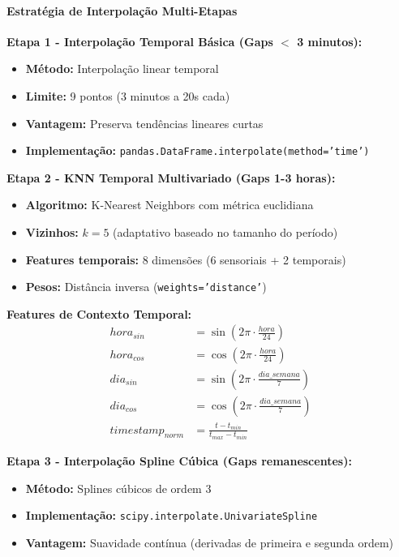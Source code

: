 \paragraph{Estratégia de Interpolação Multi-Etapas}

\textbf{Etapa 1 - Interpolação Temporal Básica (Gaps $<$ 3 minutos):}
\begin{itemize}
    \item \textbf{Método:} Interpolação linear temporal
    \item \textbf{Limite:} 9 pontos (3 minutos a 20s cada)
    \item \textbf{Vantagem:} Preserva tendências lineares curtas
    \item \textbf{Implementação:} \texttt{pandas.DataFrame.interpolate(method='time')}
\end{itemize}

\textbf{Etapa 2 - KNN Temporal Multivariado (Gaps 1-3 horas):}
\begin{itemize}
    \item \textbf{Algoritmo:} K-Nearest Neighbors com métrica euclidiana
    \item \textbf{Vizinhos:} $k = 5$ (adaptativo baseado no tamanho do período)
    \item \textbf{Features temporais:} 8 dimensões (6 sensoriais + 2 temporais)
    \item \textbf{Pesos:} Distância inversa (\texttt{weights='distance'})
\end{itemize}

\textbf{Features de Contexto Temporal:}
\begin{align}
hora_{sin} &= \sin\left(2\pi \cdot \frac{hora}{24}\right) \\
hora_{cos} &= \cos\left(2\pi \cdot \frac{hora}{24}\right) \\
dia_{sin} &= \sin\left(2\pi \cdot \frac{dia\_semana}{7}\right) \\
dia_{cos} &= \cos\left(2\pi \cdot \frac{dia\_semana}{7}\right) \\
timestamp_{norm} &= \frac{t - t_{min}}{t_{max} - t_{min}}
\end{align}

\textbf{Etapa 3 - Interpolação Spline Cúbica (Gaps remanescentes):}
\begin{itemize}
    \item \textbf{Método:} Splines cúbicos de ordem 3
    \item \textbf{Implementação:} \texttt{scipy.interpolate.UnivariateSpline}
    \item \textbf{Vantagem:} Suavidade contínua (derivadas de primeira e segunda ordem)
\end{itemize}

